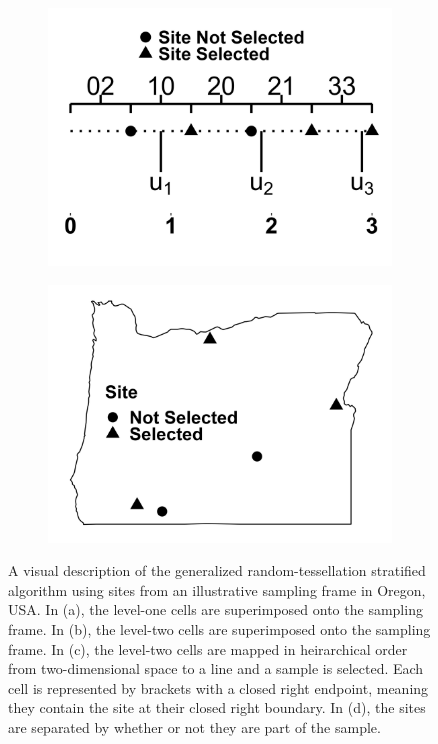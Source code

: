 \documentclass[
  shortnames]{jss}
\begin{document}
\begin{figure}
\begin{subfigure}{0.45\textwidth}
  \includegraphics[width = 1\linewidth]{images/grts_line.jpeg}
  \caption{}
  \label{fig:grts_line}
\end{subfigure}
\begin{subfigure}{0.45\textwidth}
  \centering
  \includegraphics[width = 1\linewidth]{images/grts_sample.jpeg}
  \caption{}
  \label{fig:grts_sample}
\end{subfigure}
\caption{A visual description of the generalized random-tessellation stratified algorithm using sites from an illustrative sampling frame in Oregon, USA. In (a), the level-one cells are superimposed onto the sampling frame. In (b), the level-two cells are superimposed onto the sampling frame. In (c), the level-two cells are mapped in heirarchical order from two-dimensional space to a line and a sample is selected. Each cell is represented by brackets with a closed right endpoint, meaning they contain the site at their closed right boundary. In (d), the sites are separated by whether or not they are part of the sample.}
\label{fig:comps}
\end{figure}
\end{document}
